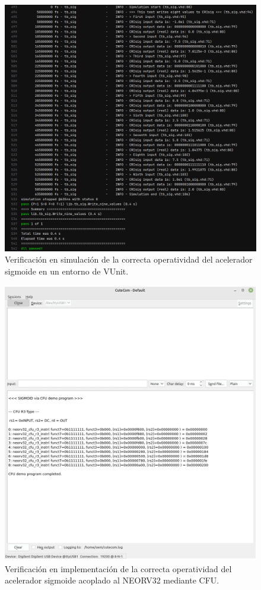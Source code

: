 
\begin{figure}[H]
    \centering
    \includegraphics[width=14cm]{Figuras/sim_sig_alone.png}
    \caption{Verificación en simulación de la correcta operatividad del acelerador sigmoide en un entorno de VUnit.}
    \label{fig:sim_alone}
\end{figure}

\begin{figure}[H]
    \centering
    \includegraphics[width=14cm]{Figuras/sig_cfu.png}
    \caption{Verificación en implementación de la correcta operatividad del acelerador sigmoide acoplado al NEORV32 mediante CFU.}
    \label{fig:impl_complex}
\end{figure}

